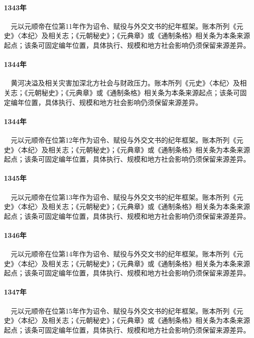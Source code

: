 \paragraph{1343年}　元以元顺帝在位第11年作为诏令、赋役与外交文书的纪年框架。账本所列《元史》〈本纪〉及相关志；《元朝秘史》；《元典章》或《通制条格》相关条为本条来源起点；该条可固定编年位置，具体执行、规模和地方社会影响仍须保留来源差异。

\paragraph{1344年}　黄河决溢及相关灾害加深北方社会与财政压力。账本所列《元史》〈本纪〉及相关志；《元朝秘史》；《元典章》或《通制条格》相关条为本条来源起点；该条可固定编年位置，具体执行、规模和地方社会影响仍须保留来源差异。

\paragraph{1344年}　元以元顺帝在位第12年作为诏令、赋役与外交文书的纪年框架。账本所列《元史》〈本纪〉及相关志；《元朝秘史》；《元典章》或《通制条格》相关条为本条来源起点；该条可固定编年位置，具体执行、规模和地方社会影响仍须保留来源差异。

\paragraph{1345年}　元以元顺帝在位第13年作为诏令、赋役与外交文书的纪年框架。账本所列《元史》〈本纪〉及相关志；《元朝秘史》；《元典章》或《通制条格》相关条为本条来源起点；该条可固定编年位置，具体执行、规模和地方社会影响仍须保留来源差异。

\paragraph{1346年}　元以元顺帝在位第14年作为诏令、赋役与外交文书的纪年框架。账本所列《元史》〈本纪〉及相关志；《元朝秘史》；《元典章》或《通制条格》相关条为本条来源起点；该条可固定编年位置，具体执行、规模和地方社会影响仍须保留来源差异。

\paragraph{1347年}　元以元顺帝在位第15年作为诏令、赋役与外交文书的纪年框架。账本所列《元史》〈本纪〉及相关志；《元朝秘史》；《元典章》或《通制条格》相关条为本条来源起点；该条可固定编年位置，具体执行、规模和地方社会影响仍须保留来源差异。

